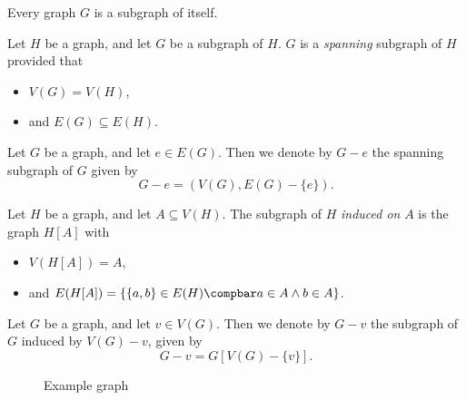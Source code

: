 \documentclass[12pt]{article}
\begin{document}
\begin{rmk}
    Every graph $G$ is a subgraph of itself.
\end{rmk}

\begin{defn}
    Let $H$ be a graph, and let $G$ be a subgraph of $H$. $G$ is a \emph{spanning} subgraph of $H$ provided that
    \begin{itemize}
        \item $V(G) = V(H)$,
        \item and $E(G) \subseteq E(H)$.
    \end{itemize}
\end{defn}

\begin{defn}
    Let $G$ be a graph, and let $e \in E(G)$. Then we denote by $G - e$ the spanning subgraph of $G$ given by \[G - e = (V(G), E(G) - \{e\}).\]
\end{defn}

\begin{defn}
    Let $H$ be a graph, and let $A \subseteq V(H)$. The subgraph of $H$ \emph{induced on} $A$ is the graph $H[A]$ with
    \begin{itemize}
        \item $V(H[A]) = A$,
        \item and $E(H[A]) = \left\{\{a, b\} \in E(H) \compbar a \in A \land b \in A\right\}$.
    \end{itemize}
\end{defn}

\begin{defn}
    Let $G$ be a graph, and let $v \in V(G)$. Then we denote by $G - v$ the subgraph of $G$ induced by $V(G) - v$, given by \[G - v = G[V(G) - \{v\}].\]
\end{defn}

\begin{figure}[ht!]
    \centering
\caption{Example graph}
\label{fig:clique-examples}
\end{figure}
\end{document}
